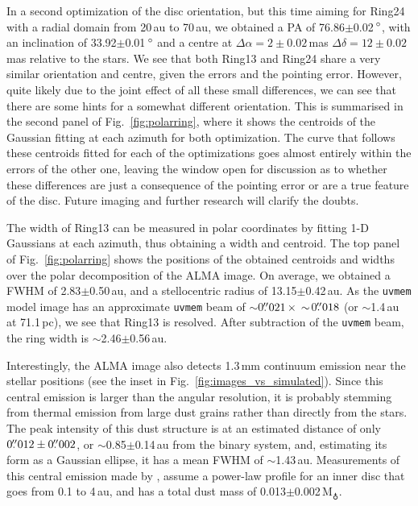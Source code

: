 \documentclass[fleqn,usenatbib,useAMS]{mnras}
\begin{document}
In a second optimization of the disc orientation, but this time aiming for Ring24 with a radial domain from 20\,au to 70\,au, we obtained a PA of 76.86$\pm$0.02\,$\hbox{$^\circ$}$, with an inclination of 33.92$\pm$0.01\,$\hbox{$^\circ$}$ and a centre at $\Delta \alpha = 2\pm0.02$\,mas $\Delta \delta = 12\pm0.02$\,mas relative to the stars. We see that both Ring13 and Ring24 share a very similar orientation and centre, given the errors and the pointing error. However, quite likely due to the joint effect of all these small differences, we can see that there are some hints for a somewhat different orientation. This is summarised in the second panel of Fig.~\ref{fig:polarring}, where it shows the centroids of the Gaussian fitting at each azimuth for both optimization. The curve that follows these centroids fitted for each of the optimizations goes almost entirely within the errors of the other one, leaving the window open for discussion as to whether these differences are just a consequence of the pointing error or are a true feature of the disc. Future imaging and further research will clarify the doubts.

The width of Ring13 can be measured in polar coordinates by fitting 1-D Gaussians at each azimuth, thus obtaining a width and centroid. The top panel of Fig.~\ref{fig:polarring} shows the positions of the obtained centroids and widths over the polar decomposition of the ALMA image. On average, we obtained a FWHM of 2.83$\pm$0.50\,au, and a stellocentric radius of 13.15$\pm$0.42\,au. As the {\tt uvmem} model image has an approximate {\tt uvmem} beam of $\sim$0$\hbox{$.\!\!^{\prime\prime}$}021 \,\times \,\sim$0$\hbox{$.\!\!^{\prime\prime}$}018$ (or $\sim$1.4\,au at 71.1\,pc), we see that Ring13 is resolved. After subtraction of the {\tt uvmem} beam, the ring width is $\sim$2.46$\pm$0.56\,au.

Interestingly, the ALMA image also detects 1.3\,mm continuum emission near the stellar positions (see the inset in Fig.~\ref{fig:images_vs_simulated}). Since this central emission is larger than the angular resolution, it is probably stemming from thermal emission from large dust grains rather than directly from the stars. The peak intensity of this dust structure is at an estimated distance of only $0\hbox{$.\!\!^{\prime\prime}$}012\pm0\hbox{$.\!\!^{\prime\prime}$}002$, or $\sim$0.85$\pm$0.14\,au from the binary system, and, estimating its form as a Gaussian ellipse, it has a mean FWHM of $\sim$1.43\,au. Measurements of this central emission made by \citet{Francis_2020}, assume a power-law profile for an inner disc that goes from 0.1 to 4\,au, and has a total dust mass of 0.013$\pm$0.002\,M$_{\earth}$.
\end{document}
